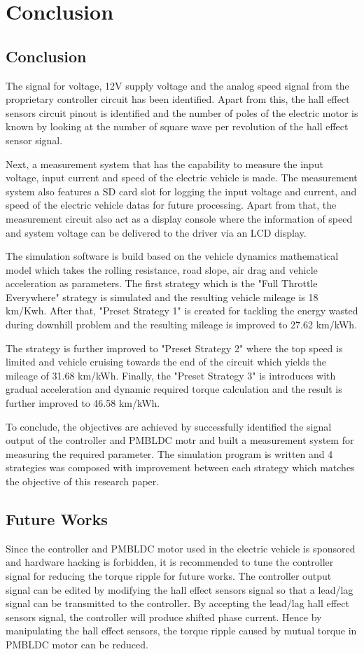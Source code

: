 \chapter{Conclusion}

\section{Conclusion}
The signal for voltage, 12V supply voltage and the analog speed signal from the proprietary controller circuit has been identified. Apart from this, the hall effect sensors circuit pinout is identified and the number of poles of the electric motor is known by looking at the number of square wave per revolution of the hall effect sensor signal.

Next, a measurement system that has the capability to measure the input voltage, input current and speed of the electric vehicle is made. The measurement system also features a SD card slot for logging the input voltage and current, and speed of the electric vehicle datas for future processing. Apart from that, the measurement circuit also act as a display console where the information of speed and system voltage can be delivered to the driver via an LCD display.

The simulation software is build based on the vehicle dynamics mathematical model which takes the rolling resistance, road slope, air drag and vehicle acceleration as parameters. The first strategy which is the "Full Throttle Everywhere" strategy is simulated and the resulting vehicle mileage is 18 km/Kwh. After that, "Preset Strategy 1" is created for tackling the energy wasted during downhill problem and the resulting mileage is improved to 27.62 km/kWh.

The strategy is further improved to "Preset Strategy 2" where the top speed is limited and vehicle cruising towards the end of the circuit which yields the mileage of 31.68 km/kWh. Finally, the "Preset Strategy 3" is introduces with gradual acceleration and dynamic required torque calculation and the result is further improved to 46.58 km/kWh.

To conclude, the objectives are achieved by successfully identified the signal output of the controller and PMBLDC motr and built a measurement system for measuring the required parameter. The simulation program is written and 4 strategies was composed with improvement between each strategy which matches the objective of this research paper.

\section{Future Works}
Since the controller and PMBLDC motor used in the electric vehicle is sponsored and hardware hacking is forbidden, it is recommended to tune the controller signal for reducing the torque ripple for future works. The controller output signal can be edited by modifying the hall effect sensors signal so that a lead/lag signal can be transmitted to the controller. By accepting the lead/lag hall effect sensors signal, the controller will produce shifted phase current. Hence by manipulating the hall effect sensors, the torque ripple caused by mutual torque in PMBLDC motor can be reduced.

